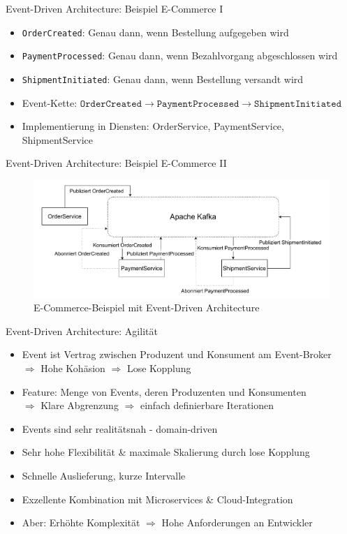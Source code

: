\begin{frame}{Event-Driven Architecture: Beispiel E-Commerce I}
    \begin{itemize}
        \item \texttt{OrderCreated}: Genau dann, wenn Bestellung aufgegeben wird
        \item \texttt{PaymentProcessed}: Genau dann, wenn Bezahlvorgang abgeschlossen wird
        \item \texttt{ShipmentInitiated}: Genau dann, wenn Bestellung versandt wird
        \item Event-Kette: $ \texttt{OrderCreated} \rightarrow \texttt{PaymentProcessed} \rightarrow \texttt{ShipmentInitiated}$
        \item Implementierung in Diensten: OrderService, PaymentService, ShipmentService
    \end{itemize}
\end{frame}

\begin{frame}{Event-Driven Architecture: Beispiel E-Commerce II}
    \begin{figure}[!h]
        \centering
        \includegraphics[scale=0.5]{imglib/eda/eda-ecommerce.drawio}
        \caption{E-Commerce-Beispiel mit Event-Driven Architecture}
        \label{fig:edaecommerce}
    \end{figure}
\end{frame}

\begin{frame}{Event-Driven Architecture: Agilität}
    \begin{itemize}
        \item Event ist Vertrag zwischen Produzent und Konsument am Event-Broker\\
        $\Rightarrow$ Hohe Kohäsion $\Rightarrow$ Lose Kopplung
        \item Feature: Menge von Events, deren Produzenten und Konsumenten\\
        $\Rightarrow$ Klare Abgrenzung $\Rightarrow$ einfach definierbare Iterationen
        \item Events sind sehr realitätsnah - domain-driven
        \item Sehr hohe Flexibilität \& maximale Skalierung durch lose Kopplung
        \item Schnelle Auslieferung, kurze Intervalle
        \item Exzellente Kombination mit Microservices \& Cloud-Integration
        \item Aber: Erhöhte Komplexität $\Rightarrow$ Hohe Anforderungen an Entwickler
    \end{itemize}
\end{frame}


